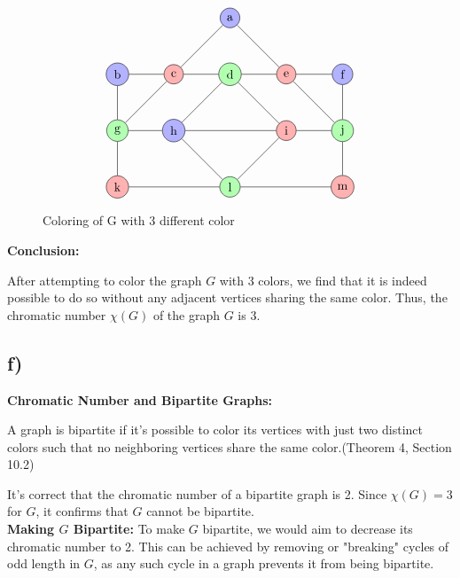 \documentclass[12pt]{article}
\begin{document}
\begin{figure}[H] 
    \[
\begin{tikzpicture}[scale=0.8]
    \node[circle,draw,fill=blue!30] (a) at (0,4) {a};
    \node[circle,draw,fill=blue!30] (b) at (-4,2) {b};
    \node[circle,draw,fill=red!30] (c) at (-2,2) {c};
    \node[circle,draw,fill=green!30] (d) at (0,2) {d};
    \node[circle,draw,fill=red!30] (e) at (2,2) {e};
    \node[circle,draw,fill=blue!30] (f) at (4,2) {f};
    \node[circle,draw,fill=green!30] (g) at (-4,0) {g};
    \node[circle,draw,fill=blue!30] (h) at (-2,0) {h};
    \node[circle,draw,fill=red!30] (i) at (2,0) {i};
    \node[circle,draw,fill=green!30] (j) at (4,0) {j};
    \node[circle,draw,fill=red!30] (k) at (-4,-2) {k};
    \node[circle,draw,fill=green!30] (l) at (0,-2) {l};
    \node[circle,draw,fill=red!30] (m) at (4,-2) {m};
    \draw (a) -- (e) -- (j);
    \draw (a) -- (c) -- (g);
    \draw (d) -- (h) -- (l) -- (i) -- (d);
    \draw (b) -- (g) -- (k);
    \draw (f) -- (j) -- (m);
    \draw (b) -- (c) -- (d) -- (e) -- (f);
    \draw (g) -- (h) -- (i) -- (j);
    \draw (k) -- (l) -- (m);
\end{tikzpicture}
\]
\caption{Coloring of G with 3 different color}
\end{figure}

\textbf{Conclusion:}

After attempting to color the graph \( G \) with 3 colors, we find that it is indeed possible to do so without any adjacent vertices sharing the same color. Thus, the chromatic number \( \chi(G) \) of the graph \( G \) is 3.


\subsection*{f)}

\textbf{Chromatic Number and Bipartite Graphs:} 


A graph is bipartite if it's possible to color its vertices with just two distinct colors such that no neighboring vertices share the same color.(Theorem 4, Section 10.2)

It's correct that the chromatic number of a bipartite graph is 2. Since \( \chi(G) = 3 \) for \( G \), it confirms that \( G \) cannot be bipartite.\\

\textbf{Making \( G \) Bipartite:} To make \( G \) bipartite, we would aim to decrease its chromatic number to 2. This can be achieved by removing or "breaking" cycles of odd length in \( G \), as any such cycle in a graph prevents it from being bipartite.
\end{document}
